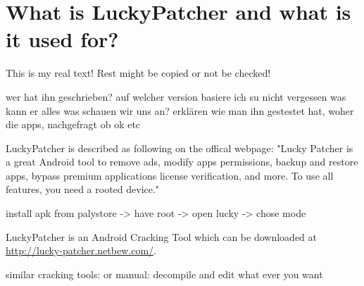 \section{What is LuckyPatcher and what is it used for?} \label{section:luckypatcher-explain}
This is my real text! Rest might be copied or not be checked!


wer hat ihn geschrieben?\newline
auf welcher version basiere ich\newline
su nicht vergessen\newline
was kann er alles\newline
was schauen wir uns an?\newline
erklären wie man ihn gestestet hat, woher die apps, nachgefragt ob ok etc\newline

LuckyPatcher is described as following on the offical webpage: "Lucky Patcher is a great Android tool to remove ads, modify apps permissions, backup and restore apps, bypass premium applications license verification, and more. To use all features, you need a rooted device." \cite{luckyPatcherOfficial}

install apk from palystore -> have root -> open lucky -> chose mode

LuckyPatcher is an Android Cracking Tool which can be downloaded at \url{http://lucky-patcher.netbew.com/}.

similar cracking tools:\newline
or manual: decompile and edit what ever you want \newline
